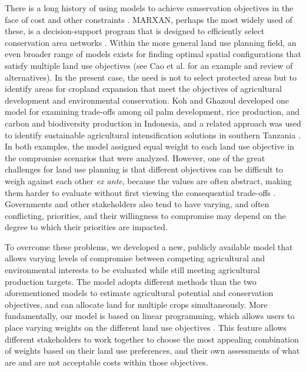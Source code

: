 \documentclass[a4paper]{article}
\begin{document}
{There is a long history of using models to achieve conservation objectives in the face of cost and other constraints \cite[e.g.][]{naidoo_integrating_2006,margules_systematic_2000}. MARXAN, perhaps the most widely used of these, is a decision-support program that is designed to efficiently select conservation area networks \citep{ball_marxan_2009,watts_marxan_2009}. Within the more general land use planning field, an even broader range of models exists for finding optimal spatial configurations that satisfy multiple land use objectives (see Cao et al. \citep{cao_spatial_2011} for an example and review of alternatives). In the present case, the need is not to select protected areas but to identify areas for cropland expansion that meet the objectives of agricultural development and environmental conservation. Koh and Ghazoul \citep{koh_spatially_2010} developed one model for examining trade-offs among oil palm development, rice production, and carbon and biodiversity production in Indonesia, and a related approach was used to identify sustainable agricultural intensification solutions in southern Tanzania \citep{nijbroek_regional_2016}. In both examples, the model assigned equal weight to each land use objective in the compromise scenarios that were analyzed. However, one of the great challenges for land use planning is that different objectives can be difficult to weigh against each other \emph{ex ante}, because the values are often abstract, making them harder to evaluate without first viewing the consequential trade-offs \citep{cao_spatial_2011,nijbroek_regional_2016}. Governments and other stakeholders also tend to have varying, and often conflicting, priorities, and their willingness to compromise may depend on the degree to which their priorities are impacted.

To overcome these problems, we developed a new, publicly available model that allows varying levels of compromise between competing agricultural and environmental interests to be evaluated while still meeting agricultural production targets. The model adopts different methods than the two aforementioned models \citep{koh_spatially_2010,nijbroek_regional_2016} to estimate agricultural potential and conservation objectives, and can allocate land for multiple crops simultaneously. More fundamentally, our model is based on linear programming, which allows users to place varying weights on the different land use objectives \citep{cao_spatial_2011}. This feature allows different stakeholders to work together to choose the most appealing combination of weights based on their land use preferences, and their own assessments of what are and are not acceptable costs within those objectives. 

}
\end{document}
